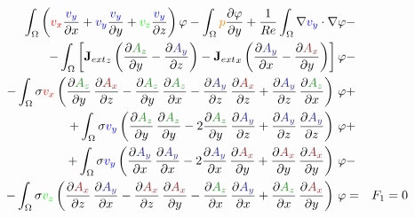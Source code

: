 \documentclass[smallextended]{svjour3}       %
\begin{document}
\begin{eqnarray}
			\int_{\Omega} \left(\textcolor{red}{v_x} \frac{\textcolor{blu}{v_y}}{\partial x} + \textcolor{blu}{v_y} \frac{\textcolor{blu}{v_y}}{\partial y} + \textcolor{gre}{v_z} \frac{\textcolor{blu}{v_y}}{\partial z}\right) \varphi
			- \int_{\Omega} \textcolor{orange}{p} \frac{\partial \varphi}{\partial y}
			+ \frac{1}{Re} \int_{\Omega} \nabla \textcolor{blu}{v_y} \cdot \nabla \varphi
			\nonumber & -\\
			- \int_{\Omega} \left[{\mathbf{J}_{ext}}_z \left(\frac{\partial \textcolor{darkgre}{A_z}}{\partial y} - \frac{\partial \textcolor{darkblu}{A_y}}{\partial z}\right) - {\mathbf{J}_{ext}}_x \left(\frac{\partial \textcolor{darkblu}{A_y}}{\partial x} - \frac{\partial \textcolor{darkred}{A_x}}{\partial y}\right)\right] \varphi			
			\nonumber & -\\
			- \int_{\Omega} \sigma \textcolor{red}{v_x} \left(\frac{\partial \textcolor{darkgre}{A_z}}{\partial y}\,\frac{\partial \textcolor{darkred}{A_x}}{\partial z} - \frac{\partial \textcolor{darkgre}{A_z}}{\partial y}\,\frac{\partial \textcolor{darkgre}{A_z}}{\partial x} - \frac{\partial \textcolor{darkblu}{A_y}}{\partial z}\,\frac{\partial \textcolor{darkred}{A_x}}{\partial z}  + \frac{\partial \textcolor{darkblu}{A_y}}{\partial z}\,\frac{\partial \textcolor{darkgre}{A_z}}{\partial x} \right)\, \varphi& +\nonumber \\			
			+ \int_{\Omega} \sigma \textcolor{blu}{v_y} \left(\frac{\partial \textcolor{darkgre}{A_z}}{\partial y}\,\frac{\partial \textcolor{darkgre}{A_z}}{\partial y} - 2 \frac{\partial \textcolor{darkgre}{A_z}}{\partial y}\,\frac{\partial \textcolor{darkblu}{A_y}}{\partial z} + \frac{\partial \textcolor{darkblu}{A_y}}{\partial z}\,\frac{\partial \textcolor{darkblu}{A_y}}{\partial z} \right)\, \varphi& +\nonumber \\			
			+ \int_{\Omega} \sigma \textcolor{blu}{v_y} \left(\frac{\partial \textcolor{darkblu}{A_y}}{\partial x}\,\frac{\partial \textcolor{darkblu}{A_y}}{\partial x} - 2 \frac{\partial \textcolor{darkblu}{A_y}}{\partial x}\,\frac{\partial \textcolor{darkred}{A_x}}{\partial y} + \frac{\partial \textcolor{darkred}{A_x}}{\partial y}\,\frac{\partial \textcolor{darkred}{A_x}}{\partial y} \right)\, \varphi& -\nonumber \\			
			- \int_{\Omega} \sigma \textcolor{gre}{v_z} \left(\frac{\partial \textcolor{darkred}{A_x}}{\partial z}\,\frac{\partial \textcolor{darkblu}{A_y}}{\partial x} - \frac{\partial \textcolor{darkred}{A_x}}{\partial z}\,\frac{\partial \textcolor{darkred}{A_x}}{\partial y} - \frac{\partial \textcolor{darkgre}{A_z}}{\partial x}\,\frac{\partial \textcolor{darkblu}{A_y}}{\partial x}  + \frac{\partial \textcolor{darkgre}{A_z}}{\partial x}\,\frac{\partial \textcolor{darkred}{A_x}}{\partial y} \right)\, \varphi& = & F_1 = 0 \\			

\end{eqnarray}
\end{document}
